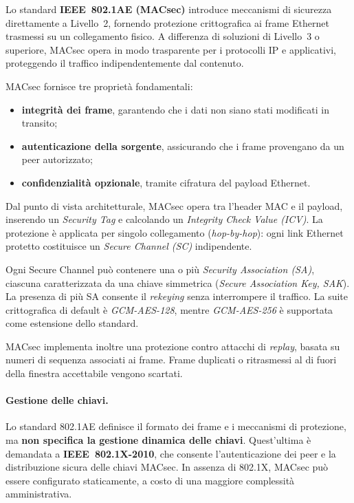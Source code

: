 Lo standard \textbf{IEEE~802.1AE (MACsec)} introduce meccanismi di sicurezza direttamente
a Livello~2, fornendo protezione crittografica ai frame Ethernet trasmessi su un collegamento fisico.
A differenza di soluzioni di Livello~3 o superiore, MACsec opera in modo trasparente
per i protocolli IP e applicativi, proteggendo il traffico indipendentemente dal contenuto.

MACsec fornisce tre proprietà fondamentali:
\begin{itemize}
  \item \textbf{integrità dei frame}, garantendo che i dati non siano stati modificati in transito;
  \item \textbf{autenticazione della sorgente}, assicurando che i frame provengano da un peer autorizzato;
  \item \textbf{confidenzialità opzionale}, tramite cifratura del payload Ethernet.
\end{itemize}

Dal punto di vista architetturale, MACsec opera tra l’header MAC e il payload,
inserendo un \emph{Security Tag} e calcolando un \emph{Integrity Check Value (ICV)}.
La protezione è applicata per singolo collegamento (\emph{hop-by-hop}):
ogni link Ethernet protetto costituisce un \emph{Secure Channel (SC)} indipendente.

Ogni Secure Channel può contenere una o più \emph{Security Association (SA)},
ciascuna caratterizzata da una chiave simmetrica (\emph{Secure Association Key, SAK}).
La presenza di più SA consente il \emph{rekeying} senza interrompere il traffico.
La suite crittografica di default è \emph{GCM-AES-128},
mentre \emph{GCM-AES-256} è supportata come estensione dello standard.

MACsec implementa inoltre una protezione contro attacchi di \emph{replay},
basata su numeri di sequenza associati ai frame.
Frame duplicati o ritrasmessi al di fuori della finestra accettabile vengono scartati.

\paragraph{Gestione delle chiavi.}
Lo standard 802.1AE definisce il formato dei frame e i meccanismi di protezione,
ma \textbf{non specifica la gestione dinamica delle chiavi}.
Quest’ultima è demandata a \textbf{IEEE~802.1X-2010}, che consente l’autenticazione dei peer
e la distribuzione sicura delle chiavi MACsec.
In assenza di 802.1X, MACsec può essere configurato staticamente,
a costo di una maggiore complessità amministrativa.

